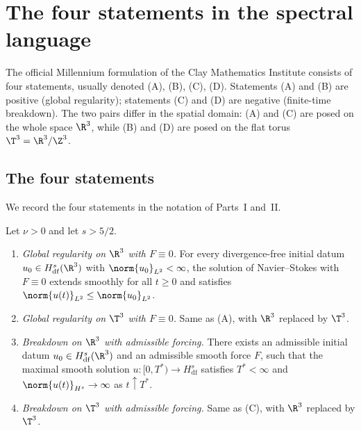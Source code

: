 \section{The four statements in the spectral language}
\label{part-3:sec:four-statements}

The official Millennium formulation of the Clay Mathematics Institute 
consists of four statements, usually denoted (A), (B), (C), (D). 
Statements (A) and (B) are positive (global regularity); statements 
(C) and (D) are negative (finite-time breakdown). The two pairs 
differ in the spatial domain: (A) and (C) are posed on the whole space 
$\R^3$, while (B) and (D) are posed on the flat torus 
$\T^3 = \R^3/\Z^3$.

\subsection{The four statements}
\label{part-3:ssec:four}

We record the four statements in the notation of Parts~I and~II.

\begin{definition}\label{part-3:def:four}
Let $\nu>0$ and let $s>5/2$.

\begin{enumerate}[label=(\Alph*),leftmargin=*]
\item[(A)] \emph{Global regularity on $\R^3$ with $F\equiv 0$.} 
      For every divergence-free initial datum 
      $u_0\in H^s_{\mathrm{df}}(\R^3)$ with 
      $\norm{u_0}_{L^2}<\infty$, the solution of Navier--Stokes 
      with $F\equiv 0$ extends smoothly for all $t\geq 0$ and 
      satisfies $\norm{u(t)}_{L^2}\leq\norm{u_0}_{L^2}$.

\item[(B)] \emph{Global regularity on $\T^3$ with $F\equiv 0$.} 
      Same as (A), with $\R^3$ replaced by $\T^3$.

\item[(C)] \emph{Breakdown on $\R^3$ with admissible forcing.} 
      There exists an admissible initial datum 
      $u_0\in H^s_{\mathrm{df}}(\R^3)$ and an admissible smooth 
      force $F$, such that the maximal smooth solution 
      $u:[0,T^\ast)\to H^s_{\mathrm{df}}$ satisfies $T^\ast<\infty$ 
      and $\norm{u(t)}_{H^s}\to\infty$ as $t\uparrow T^\ast$.

\item[(D)] \emph{Breakdown on $\T^3$ with admissible forcing.} 
      Same as (C), with $\R^3$ replaced by $\T^3$.
\end{enumerate}
\end{definition}

